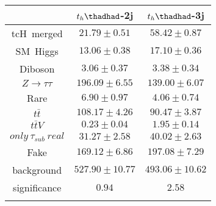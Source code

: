 \centering
\begin{tabular}{|ccc} \toprule\toprule
 & $t_{h}\thadhad$-2j & $t_{h}\thadhad$-3j\\\midrule
tcH~merged & $21.79\pm0.51$ & $58.42\pm0.87$\\
SM~Higgs & $13.06\pm0.38$ & $17.10\pm0.36$\\
Diboson & $3.06\pm0.37$ & $3.38\pm0.34$\\
$Z\to\tau\tau$ & $196.09\pm6.55$ & $139.00\pm6.07$\\
Rare & $6.90\pm0.97$ & $4.06\pm0.74$\\
$t\bar{t}$ & $108.17\pm4.26$ & $90.47\pm3.87$\\
$t\bar{t}V$ & $0.23\pm0.04$ & $1.95\pm0.14$\\
$only~\tau_{sub}~real$ & $31.27\pm2.58$ & $40.02\pm2.63$\\
Fake & $169.12\pm6.86$ & $197.08\pm7.29$\\
background & $527.90\pm10.77$ & $493.06\pm10.62$\\
significance & $0.94$ & $2.58$\\
\bottomrule\bottomrule\\
\end{tabular}

